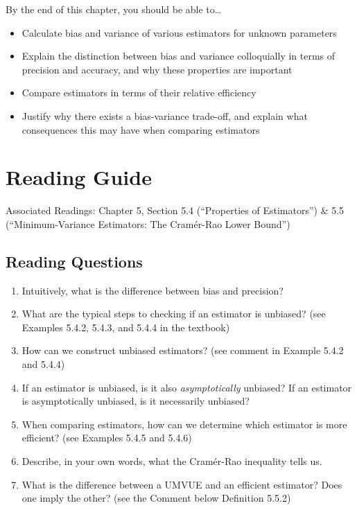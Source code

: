 \documentclass[
  letterpaper,
  DIV=11,
  numbers=noendperiod]{scrreprt}
\begin{document}
By the end of this chapter, you should be able to\ldots{}

\begin{itemize}
\item
  Calculate bias and variance of various estimators for unknown
  parameters
\item
  Explain the distinction between bias and variance colloquially in
  terms of precision and accuracy, and why these properties are
  important
\item
  Compare estimators in terms of their relative efficiency
\item
  Justify why there exists a bias-variance trade-off, and explain what
  consequences this may have when comparing estimators
\end{itemize}

\hypertarget{reading-guide-3}{%
\section{Reading Guide}\label{reading-guide-3}}

Associated Readings: Chapter 5, Section 5.4 (``Properties of
Estimators'') \& 5.5 (``Minimum-Variance Estimators: The Cramér-Rao
Lower Bound'')

\hypertarget{reading-questions-3}{%
\subsection{Reading Questions}\label{reading-questions-3}}

\begin{enumerate}
\def\labelenumi{\arabic{enumi}.}
\item
  Intuitively, what is the difference between bias and precision?
\item
  What are the typical steps to checking if an estimator is unbiased?
  (see Examples 5.4.2, 5.4.3, and 5.4.4 in the textbook)
\item
  How can we construct unbiased estimators? (see comment in Example
  5.4.2 and 5.4.4)
\item
  If an estimator is unbiased, is it also \emph{asymptotically}
  unbiased? If an estimator is asymptotically unbiased, is it
  necessarily unbiased?
\item
  When comparing estimators, how can we determine which estimator is
  more efficient? (see Examples 5.4.5 and 5.4.6)
\item
  Describe, in your own words, what the Cramér-Rao inequality tells us.
\item
  What is the difference between a UMVUE and an efficient estimator?
  Does one imply the other? (see the Comment below Definition 5.5.2)
\end{enumerate}
\end{document}
